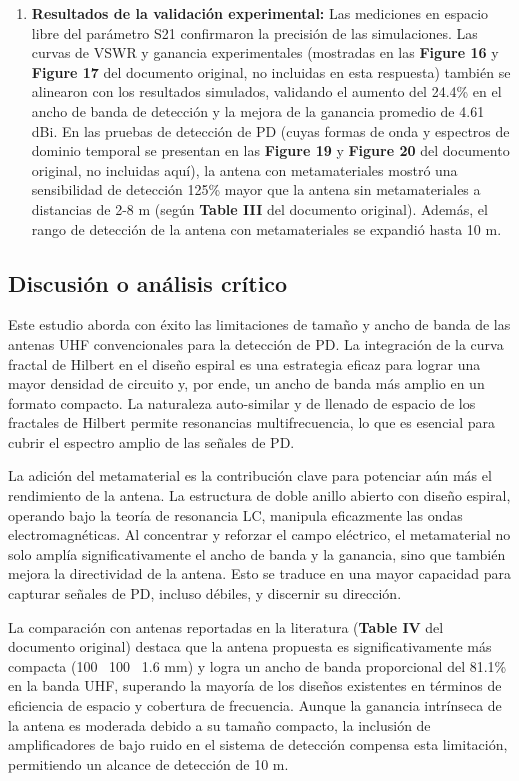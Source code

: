 \documentclass[11pt,a4paper]{article}
\begin{document}
\begin{enumerate}
    \item \textbf{Resultados de la validación experimental:}
    Las mediciones en espacio libre del parámetro S21 confirmaron la precisión de las simulaciones. Las curvas de VSWR y ganancia experimentales (mostradas en las \textbf{Figure 16} y \textbf{Figure 17} del documento original, no incluidas en esta respuesta) también se alinearon con los resultados simulados, validando el aumento del 24.4\% en el ancho de banda de detección y la mejora de la ganancia promedio de 4.61 dBi.
    En las pruebas de detección de PD (cuyas formas de onda y espectros de dominio temporal se presentan en las \textbf{Figure 19} y \textbf{Figure 20} del documento original, no incluidas aquí), la antena con metamateriales mostró una sensibilidad de detección 125\% mayor que la antena sin metamateriales a distancias de 2-8 m (según \textbf{Table III} del documento original). Además, el rango de detección de la antena con metamateriales se expandió hasta 10 m.
\end{enumerate}

\subsection*{Discusión o análisis crítico}
Este estudio aborda con éxito las limitaciones de tamaño y ancho de banda de las antenas UHF convencionales para la detección de PD. La integración de la curva fractal de Hilbert en el diseño espiral es una estrategia eficaz para lograr una mayor densidad de circuito y, por ende, un ancho de banda más amplio en un formato compacto. La naturaleza auto-similar y de llenado de espacio de los fractales de Hilbert permite resonancias multifrecuencia, lo que es esencial para cubrir el espectro amplio de las señales de PD.

La adición del metamaterial es la contribución clave para potenciar aún más el rendimiento de la antena. La estructura de doble anillo abierto con diseño espiral, operando bajo la teoría de resonancia LC, manipula eficazmente las ondas electromagnéticas. Al concentrar y reforzar el campo eléctrico, el metamaterial no solo amplía significativamente el ancho de banda y la ganancia, sino que también mejora la directividad de la antena. Esto se traduce en una mayor capacidad para capturar señales de PD, incluso débiles, y discernir su dirección.

La comparación con antenas reportadas en la literatura (\textbf{Table IV} del documento original) destaca que la antena propuesta es significativamente más compacta (100 \texttimes\ 100 \texttimes\ 1.6 mm) y logra un ancho de banda proporcional del 81.1\% en la banda UHF, superando la mayoría de los diseños existentes en términos de eficiencia de espacio y cobertura de frecuencia. Aunque la ganancia intrínseca de la antena es moderada debido a su tamaño compacto, la inclusión de amplificadores de bajo ruido en el sistema de detección compensa esta limitación, permitiendo un alcance de detección de 10 m.
\end{document}
